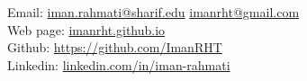 { %
\noindent
\small \faEnvelope  \hspace{0.05cm}   Email: \href{mailto:iman.rahmati@sharif.edu}{iman.rahmati@sharif.edu} \space \href{mailto:imanrht@gmail.com}{imanrht@gmail.com} \\
\faLink \hspace{0.05cm} Web page: \href{https://imanrht.github.io}{imanrht.github.io} \\
\faGithub \hspace{0.1cm} Github: \href{https://github.com/ImanRHT}{https://github.com/ImanRHT}  \\
\faLinkedin \hspace{0.1cm} Linkedin: \href{https://linkedin.com/in/iman-rahmati}{linkedin.com/in/iman-rahmati}\\
}
